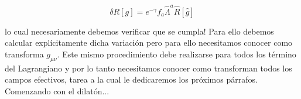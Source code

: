 \documentclass{article}
\numberwithin{equation}{section}
\begin{document}
\begin{equation}
\delta R[g] = e^{- \gamma} f_a \hat{\Lambda}^a \hat{R}[\hat{g}]
\end{equation}

lo cual necesariamente debemos verificar que se cumpla! Para ello debemos calcular explícitamente dicha variación pero para ello necesitamos conocer como transforma $ g_{\mu \nu} $. Este mismo procedimiento debe realizarse para todos los término del Lagrangiano y por lo tanto necesitamos conocer como transforman todos los campos efectivos, tarea a la cual le dedicaremos los próximos párrafos.\\

Comenzando con el dilatón...
\end{document}
